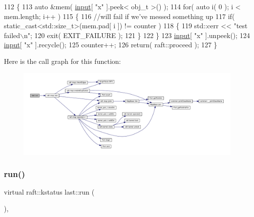 \begin{DoxyCode}
112     \{
113         \textcolor{keyword}{auto} &mem( \hyperlink{classraft_1_1kernel_a6edbe35a56409d402e719b3ac36d6554}{input}[ \textcolor{stringliteral}{"x"} ].peek< obj\_t >() );
114         \textcolor{keywordflow}{for}( \textcolor{keyword}{auto} i( 0 ); i < mem.length; i++ )
115         \{
116             \textcolor{comment}{//will fail if we've messed something up}
117             \textcolor{keywordflow}{if}( static\_cast<std::size\_t>(mem.pad[ i ]) != counter )
118             \{
119                 std::cerr << \textcolor{stringliteral}{"test failed\(\backslash\)n"};
120                 exit( EXIT\_FAILURE );
121             \}
122         \}
123         \hyperlink{classraft_1_1kernel_a6edbe35a56409d402e719b3ac36d6554}{input}[ \textcolor{stringliteral}{"x"} ].unpeek();
124         \hyperlink{classraft_1_1kernel_a6edbe35a56409d402e719b3ac36d6554}{input}[ \textcolor{stringliteral}{"x"} ].recycle();
125         counter++;
126         \textcolor{keywordflow}{return}( raft::proceed );
127     \}
\end{DoxyCode}
Here is the call graph for this function\+:
\nopagebreak
\begin{figure}[H]
\begin{center}
\leavevmode
\includegraphics[width=350pt]{classlast_a7a1da1c30f571a8e8ccb515ca2cb2f02_cgraph}
\end{center}
\end{figure}
\hypertarget{classlast_a7a1da1c30f571a8e8ccb515ca2cb2f02}{}\label{classlast_a7a1da1c30f571a8e8ccb515ca2cb2f02} 
\subsubsection{\texorpdfstring{run()}{run()}\hspace{0.1cm}{\footnotesize\ttfamily [5/6]}}
{\footnotesize\ttfamily virtual raft\+::kstatus last\+::run (\begin{DoxyParamCaption}{ }\end{DoxyParamCaption})\hspace{0.3cm}{\ttfamily [inline]}, {\ttfamily [virtual]}}


